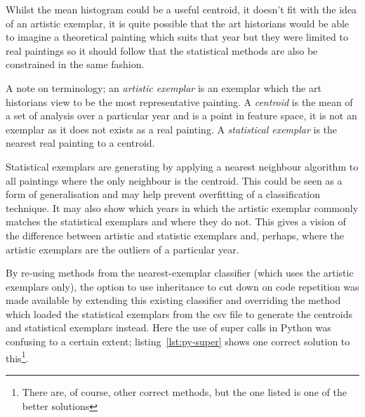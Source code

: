Whilst the mean histogram could be a useful centroid, it doesn't fit with the idea of an artistic 
exemplar, it is quite possible that the art historians would be able to imagine a theoretical
painting which suits that year but they were limited to real paintings so it should follow that
the statistical methods are also be constrained in the same fashion.

A note on terminology; an \emph{artistic exemplar} is an exemplar which the art historians view
to be the most representative painting. A \emph{centroid} is the mean of a set of analysis over a
particular year and is a point in feature space, it is not an exemplar as it does not exists as a 
real painting. A \emph{statistical exemplar} is the nearest real painting to a centroid.

Statistical exemplars are generating by applying a nearest neighbour algorithm to all paintings
where the only neighbour is the centroid. This could be seen as a form of generalisation and may
help prevent overfitting of a classification technique. It may also show which years in which
the artistic exemplar commonly matches the statistical exemplars and where they do not. This gives
a vision of the difference between artistic and statistic exemplars and, perhaps, where the 
artistic exemplars are the outliers of a particular year.



By re-using methods from the nearest-exemplar classifier (which uses the artistic exemplars only), 
the option to use inheritance to cut down on code repetition was made available by extending this
existing classifier and overriding the method which loaded the statistical exemplars from the 
\gls{csv} file to generate the centroids and statistical exemplars instead. Here the use of super 
calls in Python was confusing to a certain extent; listing~\ref{lst:py-super} shows one correct 
solution to this\footnote{There are, of course, other correct methods, but the one listed is one 
of the better solutions}.

